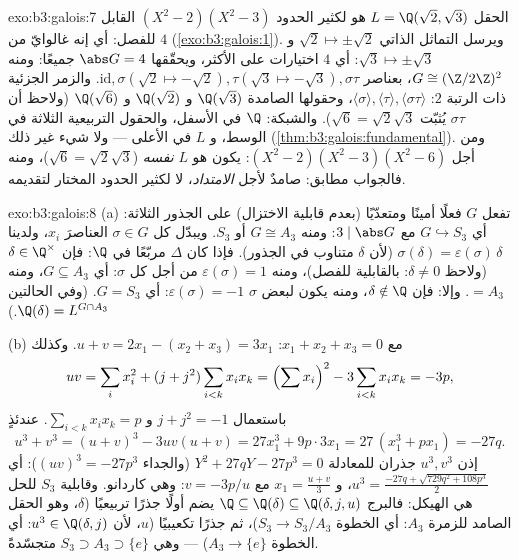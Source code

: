 \begin{solution}{exo:b3:galois:7}
الحقل $L = \Q(\sqrt2, \sqrt3)$ هو  لكثير الحدود $(X^2 -
2)(X^2 - 3)$ القابل للفصل:
أي إنه غالوايّ من  $4$ (\cref{exo:b3:galois:1}). ويرسل التماثل الذاتي
$\sqrt2 \mapsto
\pm\sqrt2$ و $\sqrt3 \mapsto \pm\sqrt3$: أي $4$ اختيارات على الأكثر، ويحقّقها
$\abs G = 4$ جميعًا: ومنه $G \cong (\Z/2\Z)^2$، بعناصر $\mathrm{id}, \sigma (\sqrt2 \mapsto -\sqrt2), \tau
(\sqrt3\mapsto-\sqrt3), \sigma\tau$. والزمر الجزئية
ذات الرتبة $2$: $\langle\sigma\rangle, \langle\tau\rangle,
\langle\sigma\tau\rangle$، وحقولها الصامدة $\Q(\sqrt3)$
و $\Q(\sqrt2)$ و $\Q(\sqrt6)$ (ولاحظ أن $\sigma\tau$ يُثبّت
$\sqrt6 =
\sqrt2\sqrt3$). والشبكة: $\Q$ في الأسفل، والحقول التربيعية الثلاثة في
الوسط، و $L$ في الأعلى --- ولا شيء غير ذلك (\cref{thm:b3:galois:fundamental}). ومن
أجل $(X^2-2)(X^2-3)(X^2-6)$: يكون  هو $L$ \emph{نفسه} ($\sqrt6 =
\sqrt2\sqrt3$)، ومنه
فالجواب مطابق:  صامدٌ لأجل \emph{الامتداد}، لا لكثير
الحدود المختار لتقديمه.
\end{solution}

\begin{solution}{exo:b3:galois:8}
(a) تفعل $G$ فعلًا أمينًا ومتعدّيًا (بعدم قابلية الاختزال) على
الجذور الثلاثة: أي $G \hookrightarrow S_3$ مع $3 \mid \abs G$: ومنه $G
\cong A_3$ أو
$S_3$. ويبدّل كل $\sigma \in G$ العناصرَ $x_i$، ولدينا $\sigma(\delta) = \varepsilon(\sigma)\,\delta$
(لأن $\delta$ متناوب في الجذور). فإذا كان $\Delta$ مربّعًا في
$\Q$: فإن $\delta \in \Q^\times$ (ولاحظ $\delta \neq 0$: بالقابلية للفصل)،
ومنه $\varepsilon(\sigma) = 1$ من أجل كل $\sigma$: أي $G \subseteq A_3$، ومنه $= A_3$.
وإلا: فإن $\delta \notin \Q$، ومنه يكون لبعض $\sigma$ $\varepsilon(\sigma) = -1$: أي
$G = S_3$. (وفي الحالتين $\Q(\delta)
= L^{G \cap A_3}$.)

(b) مع $x_1 + x_2 + x_3 = 0$: $u + v = 2x_1 - (x_2 + x_3) =
3x_1$. وكذلك
\[
uv = \sum_i x_i^2 + (j + j^2)\sum_{i<k}x_ix_k
= \Bigl(\sum x_i\Bigr)^2 - 3\sum_{i<k}x_ix_k = -3p,
\]
باستعمال $j + j^2 = -1$ و $\sum_{i<k}x_ix_k = p$. عندئذٍ
\[
u^3 + v^3 = (u+v)^3 - 3uv(u+v) = 27x_1^3 + 9p\cdot 3x_1
= 27\,(x_1^3 + px_1) = -27q .
\]
إذن $u^3, v^3$ جذران للمعادلة $Y^2 + 27qY - 27p^3 = 0$ (والجداء $(uv)^3 = -27p^3$): أي $u^3 = \frac{-27q +
\sqrt{729q^2 + 108p^3}}2$،
و $x_1 = \frac{u + v}3$ مع $v =
-3p/u$: وهي كاردانو. وقابلية $S_3$ للحل هي الهيكل:
فالبرج $\Q \subseteq \Q(\delta) \subseteq \Q(\delta, j, u)$ يضم أولًا جذرًا تربيعيًا ($\delta$، وهو الحقل
الصامد للزمرة $A_3$: أي الخطوة $S_3 \to S_3/A_3$)، ثم جذرًا تكعيبيًا ($u$، لأن
$u^3
\in \Q(\delta, j)$: أي الخطوة $A_3 \to \{e\}$) --- وهي 
$S_3 \supset A_3 \supset \{e\}$ متجسّدةً.
\end{solution}


